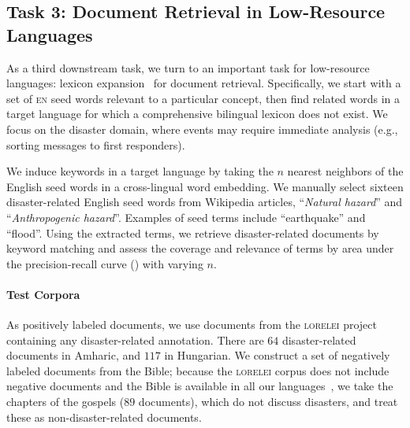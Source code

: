 \subsection{Task 3: Document Retrieval in Low-Resource Languages}
\label{sec:task3}

As a third downstream task, we turn to an important task for low-resource languages: lexicon
expansion~\citep{gupta-manning:2015:NAACL-HLT,hamilton-EtAl:2016:EMNLP2016} for document retrieval.
Specifically, we start with a set of \textsc{en}
seed words relevant to a particular concept, then 
find related words in a target language for which a
comprehensive bilingual lexicon does not exist.  We
focus on the disaster domain, where events may require immediate
{} analysis
(e.g., sorting 
messages to first responders).

We induce keywords in a target language by taking the $n$ nearest
neighbors of the English seed words in a cross-lingual word embedding.
We manually select sixteen disaster-related English seed words
from
Wikipedia articles, ``{\it Natural hazard}'' and ``{\it Anthropogenic
  hazard}''.  Examples of seed terms include ``earthquake'' and ``flood''.
Using the extracted terms, we retrieve disaster-related documents by
keyword matching and assess the coverage and relevance of terms by
area under the precision-recall curve () with varying $n$.


\vspace{-0.5ex}
\paragraph{Test Corpora}

As positively labeled documents, we use documents from the
\textsc{lorelei} project~\citep{LORELEI_lang_packs} containing any
disaster-related annotation.
There are $64$ disaster-related documents in Amharic, and $117$ in Hungarian.
We construct a set of negatively labeled documents from the Bible;
because the \textsc{lorelei} corpus does not include negative
documents and the Bible is available in all our
languages~\citep{Christodouloupoulos:2015},
we take the chapters of the gospels ($89$ documents), which do not discuss disasters,
and treat these as non-disaster-related documents.


